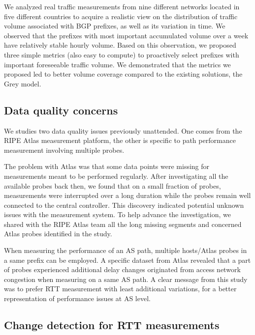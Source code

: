 We analyzed real traffic measurements from nine different networks located in five different countries to acquire a realistic view on the distribution of traffic volume associated with BGP prefixes, as well as its variation in time.   
We observed that the prefixes with most important accumulated volume over a week have relatively stable hourly volume. 
Based on this observation, we proposed three simple 
metrics (also easy to compute) to proactively select prefixes with important foreseeable traffic volume.
We demonstrated that the metrics we proposed led to better volume coverage compared to the existing solutions, the Grey model.

\subsection{Data quality concerns}
We studies two data quality issues previously unattended. One comes from the RIPE Atlas measurement platform, the other is specific to path performance measurement involving multiple probes.

The problem with Atlas was that some data points were missing for measurements meant to be performed regularly.
After investigating all the available probes back then, we found that on a small fraction of probes, measurements were interrupted over a long duration while the probes remain well connected to the central controller.
This discovery indicated potential unknown issues with the measurement system.
To help advance the investigation, we shared with the RIPE Atlas team all the long missing segments and concerned Atlas probes identified in the study.

When measuring the performance of an AS path, multiple hosts/Atlas probes in a same  prefix can be employed. A specific dataset from Atlas revealed that a part of probes experienced additional delay changes originated from access network congestion when measuring on a same AS path.  A clear message from this study was to prefer RTT measurement with least additional variations, for a better representation of performance issues at AS level.

\subsection{Change detection for RTT measurements}


